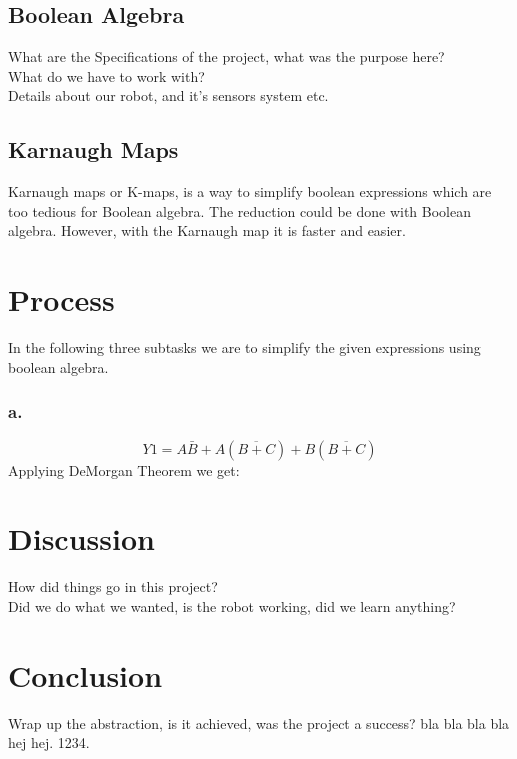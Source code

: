 \documentclass{article}
\begin{document}
\subsection*{Boolean Algebra}
What are the Specifications of the project, what was the purpose here?\\
What do we have to work with?\\
Details about our robot, and it's sensors system etc.\\


\subsection*{Karnaugh Maps}
Karnaugh maps or K-maps, is a way to simplify boolean expressions which are too tedious for Boolean algebra. The reduction could be
done with Boolean algebra. However, with the Karnaugh map it is faster and easier.

\pagebreak

 \addtocounter{section}{1}
\section*{Process}
\noindent In the following three subtasks we are to simplify the given expressions using boolean algebra.
\subsubsection*{a.} 
\[Y1= A\bar{B} + A(\overline{B+C}) + B(\overline{B+C})\]
Applying DeMorgan Theorem we get:



\pagebreak


\section*{Discussion}
 \addtocounter{section}{1}
How did things go in this project? \\
Did we do what we wanted, is the robot working, did we learn anything?\\

\section*{Conclusion}
 \addtocounter{section}{1}
Wrap up the abstraction, is it achieved, was the project a success? bla bla bla bla hej hej. 1234.

\vspace{3mm}
\end{document}
